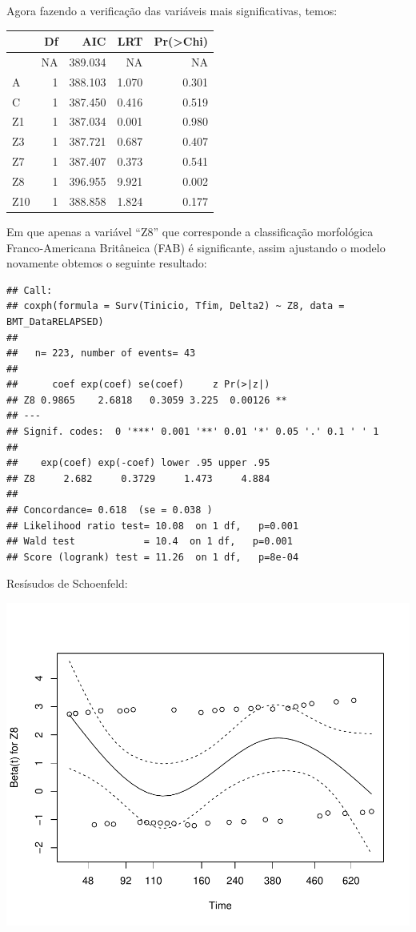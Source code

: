 \documentclass[]{article}
\begin{document}
Agora fazendo a verificação das variáveis mais significativas, temos:

\begin{longtable}[]{@{}lrrrr@{}}
\toprule
& Df & AIC & LRT & Pr(\textgreater{}Chi)\tabularnewline
\midrule
\endhead
& NA & 389.034 & NA & NA\tabularnewline
A & 1 & 388.103 & 1.070 & 0.301\tabularnewline
C & 1 & 387.450 & 0.416 & 0.519\tabularnewline
Z1 & 1 & 387.034 & 0.001 & 0.980\tabularnewline
Z3 & 1 & 387.721 & 0.687 & 0.407\tabularnewline
Z7 & 1 & 387.407 & 0.373 & 0.541\tabularnewline
Z8 & 1 & 396.955 & 9.921 & 0.002\tabularnewline
Z10 & 1 & 388.858 & 1.824 & 0.177\tabularnewline
\bottomrule
\end{longtable}

Em que apenas a variável ``Z8'' que corresponde a classificação
morfológica Franco-Americana Britâneica (FAB) é significante, assim
ajustando o modelo novamente obtemos o seguinte resultado:

\begin{verbatim}
## Call:
## coxph(formula = Surv(Tinicio, Tfim, Delta2) ~ Z8, data = BMT_DataRELAPSED)
## 
##   n= 223, number of events= 43 
## 
##      coef exp(coef) se(coef)     z Pr(>|z|)   
## Z8 0.9865    2.6818   0.3059 3.225  0.00126 **
## ---
## Signif. codes:  0 '***' 0.001 '**' 0.01 '*' 0.05 '.' 0.1 ' ' 1
## 
##    exp(coef) exp(-coef) lower .95 upper .95
## Z8     2.682     0.3729     1.473     4.884
## 
## Concordance= 0.618  (se = 0.038 )
## Likelihood ratio test= 10.08  on 1 df,   p=0.001
## Wald test            = 10.4  on 1 df,   p=0.001
## Score (logrank) test = 11.26  on 1 df,   p=8e-04
\end{verbatim}

Resísudos de Schoenfeld:

\begin{center}\includegraphics[width=0.8\linewidth]{Lista_5_files/figure-latex/unnamed-chunk-4-1} \end{center}
\end{document}
